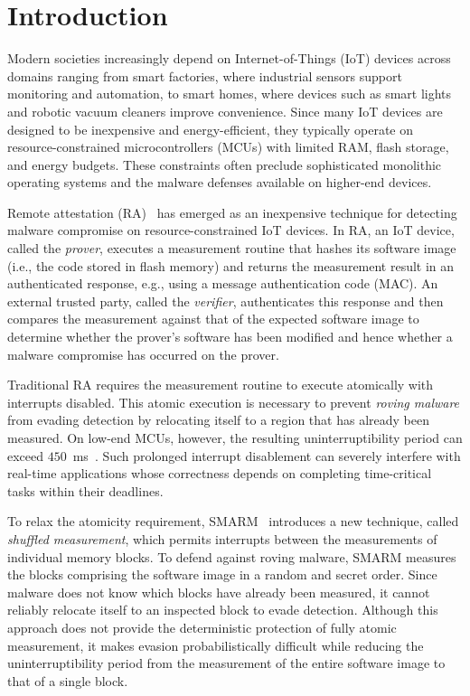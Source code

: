 \documentclass[conference]{IEEEtran}
\begin{document}
\section{Introduction}
\label{sec:intro}

Modern societies increasingly depend on Internet-of-Things (IoT) devices across domains ranging from smart factories, where industrial sensors support monitoring and automation, to smart homes, where devices such as smart lights and robotic vacuum cleaners improve convenience. 
Since many IoT devices are designed to be inexpensive and energy-efficient, they typically operate on resource-constrained microcontrollers (MCUs) with limited RAM, flash storage, and energy budgets. These constraints often preclude sophisticated monolithic operating systems and the malware defenses available on higher-end devices.

Remote attestation (RA)~\cite{eldefrawy2012smart,nunes2019vrased,eldefrawy2017hydra} has emerged as an inexpensive technique for detecting malware compromise on resource-constrained IoT devices. In RA, an IoT device, called the \emph{prover}, executes a measurement routine that hashes its software image (i.e., the code stored in flash memory) and returns the measurement result in an authenticated response, e.g., using a message authentication code (MAC). 
An external trusted party, called the \emph{verifier}, authenticates this response and then compares the measurement against that of the expected software image to determine whether the prover's software has been modified and hence whether a malware compromise has occurred on the prover.

Traditional RA requires the measurement routine to execute atomically with interrupts disabled. This atomic execution is necessary to prevent \emph{roving malware} from evading detection by relocating itself to a region that has already been measured. On low-end MCUs, however, the resulting uninterruptibility period can exceed $450$~ms~\cite{nunes2019vrased}. Such prolonged interrupt disablement can severely interfere with real-time applications whose correctness depends on completing time-critical tasks within their deadlines.

To relax the atomicity requirement, SMARM~\cite{carpent2018smarm} introduces a new technique, called \emph{shuffled measurement}, which permits interrupts between the measurements of individual memory blocks. To defend against roving malware, SMARM measures the blocks comprising the software image in a random and secret order. Since malware does not know which blocks have already been measured, it cannot reliably relocate itself to an inspected block to evade detection. Although this approach does not provide the deterministic protection of fully atomic measurement, it makes evasion probabilistically difficult while reducing the uninterruptibility period from the measurement of the entire software image to that of a single block.
\end{document}
